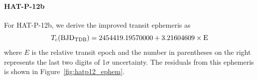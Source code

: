 \paragraph{HAT-P-12b}
For HAT-P-12b, we derive the improved transit ephemeris as
\begin{equation}
T_c(\rm{BJD_{TDB}})= 2454419.19570000+3.21604609 \times E
\end{equation}
where $E$ is the relative transit epoch and the number in parentheses on the right represents the last two digits of 1$\sigma$ uncertainty.
The residuals from this ephemeris %
is shown in Figure~\ref{fig:hatp12_ephem}.

